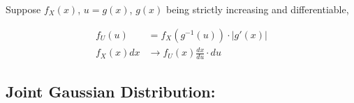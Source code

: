 \documentclass[11pt,letterpaper,titlepage]{article}
\begin{document}
\begin{itemize}
    Suppose $f_X(x)$, $u = g(x)$, $g(x)$ being strictly increasing and differentiable,
    
    \begin{equation*}
        \begin{aligned}
            f_U(u) &= f_X(g^{-1}(u)) \cdot |g'(x)| \\
            f_X(x) dx &\rightarrow f_U(x) \frac{dx}{du} \cdot du
        \end{aligned}
    \end{equation*}
    
\end{itemize}

\subsection{Joint Gaussian Distribution:}
\end{document}
